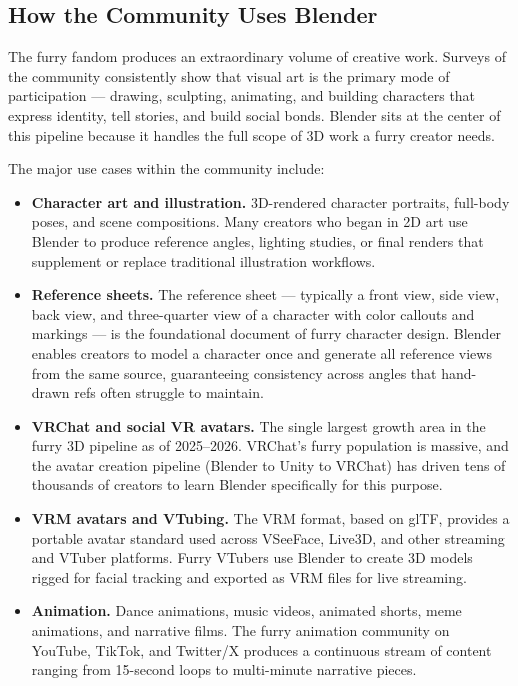 \subsection{How the Community Uses Blender}

The furry fandom produces an extraordinary volume of creative work. Surveys of the community consistently show that visual art is the primary mode of participation --- drawing, sculpting, animating, and building characters that express identity, tell stories, and build social bonds. Blender sits at the center of this pipeline because it handles the full scope of 3D work a furry creator needs.

The major use cases within the community include:

\begin{itemize}[leftmargin=2em]
  \item \textbf{Character art and illustration.} 3D-rendered character portraits, full-body poses, and scene compositions. Many creators who began in 2D art use Blender to produce reference angles, lighting studies, or final renders that supplement or replace traditional illustration workflows.

  \item \textbf{Reference sheets.} The reference sheet --- typically a front view, side view, back view, and three-quarter view of a character with color callouts and markings --- is the foundational document of furry character design. Blender enables creators to model a character once and generate all reference views from the same source, guaranteeing consistency across angles that hand-drawn refs often struggle to maintain.

  \item \textbf{VRChat and social VR avatars.} The single largest growth area in the furry 3D pipeline as of 2025--2026. VRChat's furry population is massive, and the avatar creation pipeline (Blender to Unity to VRChat) has driven tens of thousands of creators to learn Blender specifically for this purpose.

  \item \textbf{VRM avatars and VTubing.} The VRM format, based on glTF, provides a portable avatar standard used across VSeeFace, Live3D, and other streaming and VTuber platforms. Furry VTubers use Blender to create 3D models rigged for facial tracking and exported as VRM files for live streaming.

  \item \textbf{Animation.} Dance animations, music videos, animated shorts, meme animations, and narrative films. The furry animation community on YouTube, TikTok, and Twitter/X produces a continuous stream of content ranging from 15-second loops to multi-minute narrative pieces.


\end{itemize}
